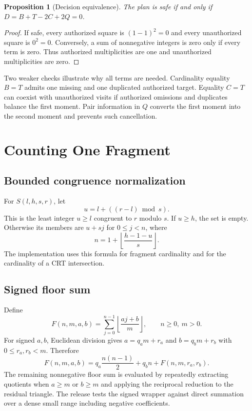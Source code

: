\documentclass[11pt,onecolumn]{IEEEtran}
\newtheorem{proposition}{Proposition}
\begin{document}
\begin{proposition}[Decision equivalence]
The plan is safe if and only if $D=B+T-2C+2Q=0$.
\end{proposition}
\begin{proof}
If safe, every authorized square is $(1-1)^2=0$ and every unauthorized square is $0^2=0$.  Conversely, a sum of nonnegative integers is zero only if every term is zero.  Thus authorized multiplicities are one and unauthorized multiplicities are zero.
\end{proof}

Two weaker checks illustrate why all terms are needed.  Cardinality equality $B=T$ admits one missing and one duplicated authorized target.  Equality $C=T$ can coexist with unauthorized visits if authorized omissions and duplicates balance the first moment.  Pair information in $Q$ converts the first moment into the second moment and prevents such cancellation.

\section{Counting One Fragment}
\subsection{Bounded congruence normalization}
For $S(l,h,s,r)$, let
\begin{equation}
 u=l+((r-l)\bmod s).
\end{equation}
This is the least integer $u\geq l$ congruent to $r$ modulo $s$.  If $u\geq h$, the set is empty.  Otherwise its members are $u+sj$ for $0\leq j<n$, where
\begin{equation}
 n=1+\left\lfloor\frac{h-1-u}{s}\right\rfloor.
\end{equation}
The implementation uses this formula for fragment cardinality and for the cardinality of a CRT intersection.

\subsection{Signed floor sum}
Define
\begin{equation}
 F(n,m,a,b)=\sum_{j=0}^{n-1}\left\lfloor\frac{aj+b}{m}\right\rfloor,
 \qquad n\geq0,\ m>0.
\end{equation}
For signed $a,b$, Euclidean division gives $a=q_am+r_a$ and $b=q_bm+r_b$ with $0\leq r_a,r_b<m$.  Therefore
\begin{equation}
 F(n,m,a,b)=q_a\frac{n(n-1)}2+q_bn+F(n,m,r_a,r_b).
\end{equation}
The remaining nonnegative floor sum is evaluated by repeatedly extracting quotients when $a\geq m$ or $b\geq m$ and applying the reciprocal reduction to the residual triangle.  The release tests the signed wrapper against direct summation over a dense small range including negative coefficients.
\end{document}
